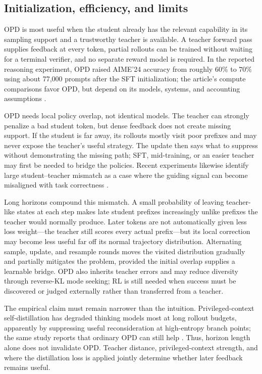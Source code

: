 \subsection{Initialization, efficiency, and limits}

OPD is most useful when the student already has the relevant capability in its sampling
support and a trustworthy teacher is available. A teacher forward pass supplies feedback
at every token, partial rollouts can be trained without waiting for a terminal verifier,
and no separate reward model is required. In the reported reasoning experiment, OPD raised
AIME'24 accuracy from roughly $60\%$ to $70\%$ using about 77,000 prompts after the SFT
initialization; the article's compute comparisons favor OPD, but depend on its models,
systems, and accounting assumptions \citep{lu2025onpolicydistillation}.

OPD needs local policy overlap, not identical models. The teacher can strongly penalize a
bad student token, but dense feedback does not create missing support. If the student is
far away, its rollouts mostly visit poor prefixes and may never expose the teacher's useful
strategy. The update then says what to suppress without demonstrating the missing path;
SFT, mid-training, or an easier teacher may first be needed to bridge the policies. Recent
experiments likewise identify large student--teacher mismatch as a case where the guiding
signal can become misaligned with task correctness \citep{wang2026demystifyingopd}.

Long horizons compound this mismatch. A small probability of leaving teacher-like states
at each step makes late student prefixes increasingly unlike prefixes the teacher would
normally produce. Later tokens are not automatically given less loss weight---the teacher
still scores every actual prefix---but its local correction may become less useful far off
its normal trajectory distribution. Alternating sample, update, and resample rounds moves
the visited distribution gradually and partially mitigates the problem, provided the
initial overlap supplies a learnable bridge. OPD also inherits teacher errors and may
reduce diversity through reverse-KL mode seeking; RL is still needed when success must be
discovered or judged externally rather than transferred from a teacher.

The empirical claim must remain narrower than the intuition. Privileged-context
self-distillation has degraded thinking models most at long rollout budgets, apparently by
suppressing useful reconsideration at high-entropy branch points; the same study reports
that ordinary OPD can still help \citep{kaur2026rethinkingopsd}. Thus, horizon length alone
does not invalidate OPD. Teacher distance, privileged-context strength, and where the
distillation loss is applied jointly determine whether later feedback remains useful.
